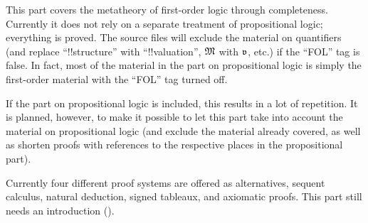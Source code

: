 \documentclass[../../include/open-logic-part]{subfiles}
\begin{document}

\begin{editorial}
  This part covers the metatheory of first-order logic through
  completeness.  Currently it does not rely on a separate treatment of
  propositional logic; everything is proved.  The source files will
  exclude the material on quantifiers (and replace ``!!{structure}''
  with ``!!{valuation}'', $\Struct{M}$ with $\pAssign{v}$, etc.) if
  the ``FOL'' tag is false. In fact, most of the material in the part
  on propositional logic is simply the first-order material with the
  ``FOL'' tag turned off.

  If the part on propositional logic is included, this results in a
  lot of repetition. It is planned, however, to make it possible to
  let this part take into account the material on propositional logic
  (and exclude the material already covered, as well as shorten proofs
  with references to the respective places in the propositional
  part).

  Currently four different proof systems are offered as
  alternatives, sequent calculus, natural deduction, signed tableaux,
  and axiomatic proofs. This part still needs an introduction
  ().
\end{editorial}












\OLEndPartHook
\end{document}
